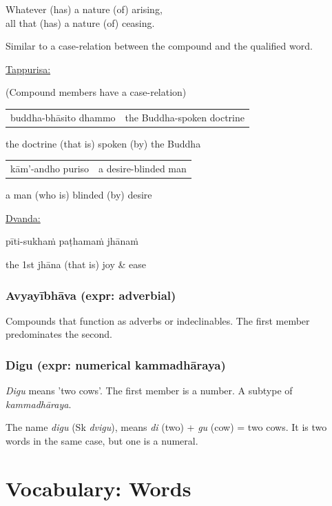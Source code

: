 \documentclass[11pt,oneside]{memoir}
\begin{document}
Whatever (has) a nature (of) arising,\\[0pt]
all that (has) a nature (of) ceasing.

Similar to a case-relation between the compound and the qualified word.

\uline{Tappurisa:}

(Compound members have a case-relation)

\begin{center}
\begin{tabular}{ll}
buddha-bhāsito dhammo & the Buddha-spoken doctrine\\[0pt]
\end{tabular}
\end{center}

the doctrine (that is) spoken (by) the Buddha

\begin{center}
\begin{tabular}{ll}
kām'-andho puriso & a desire-blinded man\\[0pt]
\end{tabular}
\end{center}

a man (who is) blinded (by) desire

\uline{Dvanda:}

pīti-sukhaṁ paṭhamaṁ jhānaṁ

the 1st jhāna (that is) joy \& ease

\subsection{Avyayībhāva (expr: adverbial)}
\label{sec:orgafe0f2a}

Compounds that function as adverbs or indeclinables. The first member predominates the second.

\subsection{Digu (expr: numerical kammadhāraya)}
\label{sec:orgeecc6cc}

\emph{Digu} means 'two cows'. The first member is a number. A subtype of \emph{kammadhāraya}.

The name \emph{digu} (Sk \emph{dvigu}), means \emph{di} (two) + \emph{gu} (cow) = two cows. It is two words in the same case, but one is a numeral.

\clearpage

\chapter{Vocabulary: Words}
\label{sec:org53209df}
\end{document}
